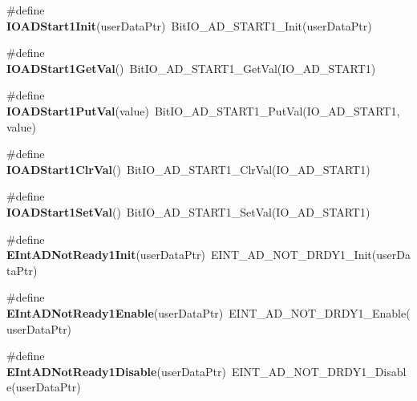 \begin{DoxyCompactItemize}
\item 
\hypertarget{group___func_ala_ga7d8934aa53776bcf21eea99312273bfa}{\#define {\bfseries I\-O\-A\-D\-Start1\-Init}(user\-Data\-Ptr)~Bit\-I\-O\-\_\-\-A\-D\-\_\-\-S\-T\-A\-R\-T1\-\_\-\-Init(user\-Data\-Ptr)}\label{group___func_ala_ga7d8934aa53776bcf21eea99312273bfa}

\item 
\hypertarget{group___func_ala_ga3c04b3c874cbcc38d0323e6babd9d1b2}{\#define {\bfseries I\-O\-A\-D\-Start1\-Get\-Val}()~Bit\-I\-O\-\_\-\-A\-D\-\_\-\-S\-T\-A\-R\-T1\-\_\-\-Get\-Val(I\-O\-\_\-\-A\-D\-\_\-\-S\-T\-A\-R\-T1)}\label{group___func_ala_ga3c04b3c874cbcc38d0323e6babd9d1b2}

\item 
\hypertarget{group___func_ala_gac7fc8f1db13d7c6f5ab129183e7fb9a1}{\#define {\bfseries I\-O\-A\-D\-Start1\-Put\-Val}(value)~Bit\-I\-O\-\_\-\-A\-D\-\_\-\-S\-T\-A\-R\-T1\-\_\-\-Put\-Val(I\-O\-\_\-\-A\-D\-\_\-\-S\-T\-A\-R\-T1, value)}\label{group___func_ala_gac7fc8f1db13d7c6f5ab129183e7fb9a1}

\item 
\hypertarget{group___func_ala_ga55876176e0bd8aa4fb9a2cb3d9aaa3e6}{\#define {\bfseries I\-O\-A\-D\-Start1\-Clr\-Val}()~Bit\-I\-O\-\_\-\-A\-D\-\_\-\-S\-T\-A\-R\-T1\-\_\-\-Clr\-Val(I\-O\-\_\-\-A\-D\-\_\-\-S\-T\-A\-R\-T1)}\label{group___func_ala_ga55876176e0bd8aa4fb9a2cb3d9aaa3e6}

\item 
\hypertarget{group___func_ala_ga924f20f4755313a9f95b78f0926c694e}{\#define {\bfseries I\-O\-A\-D\-Start1\-Set\-Val}()~Bit\-I\-O\-\_\-\-A\-D\-\_\-\-S\-T\-A\-R\-T1\-\_\-\-Set\-Val(I\-O\-\_\-\-A\-D\-\_\-\-S\-T\-A\-R\-T1)}\label{group___func_ala_ga924f20f4755313a9f95b78f0926c694e}

\end{DoxyCompactItemize}
\begin{DoxyCompactItemize}
\item 
\hypertarget{group___func_ala_ga04e62c9ba2cc97a0e6f079cc96394f4b}{\#define {\bfseries E\-Int\-A\-D\-Not\-Ready1\-Init}(user\-Data\-Ptr)~E\-I\-N\-T\-\_\-\-A\-D\-\_\-\-N\-O\-T\-\_\-\-D\-R\-D\-Y1\-\_\-\-Init(user\-Data\-Ptr)}\label{group___func_ala_ga04e62c9ba2cc97a0e6f079cc96394f4b}

\item 
\hypertarget{group___func_ala_ga32ceb39537ff89b0b3f08aede33dc4e2}{\#define {\bfseries E\-Int\-A\-D\-Not\-Ready1\-Enable}(user\-Data\-Ptr)~E\-I\-N\-T\-\_\-\-A\-D\-\_\-\-N\-O\-T\-\_\-\-D\-R\-D\-Y1\-\_\-\-Enable(user\-Data\-Ptr)}\label{group___func_ala_ga32ceb39537ff89b0b3f08aede33dc4e2}

\item 
\hypertarget{group___func_ala_ga7c6cf6de9c1b9268a5d285891be6c1eb}{\#define {\bfseries E\-Int\-A\-D\-Not\-Ready1\-Disable}(user\-Data\-Ptr)~E\-I\-N\-T\-\_\-\-A\-D\-\_\-\-N\-O\-T\-\_\-\-D\-R\-D\-Y1\-\_\-\-Disable(user\-Data\-Ptr)}\label{group___func_ala_ga7c6cf6de9c1b9268a5d285891be6c1eb}

\end{DoxyCompactItemize}
